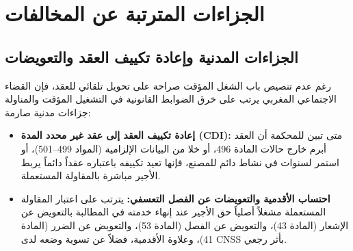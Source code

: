 \section{الجزاءات المترتبة عن المخالفات}

\subsection{الجزاءات المدنية وإعادة تكييف العقد والتعويضات}
رغم عدم تنصيص باب الشغل المؤقت صراحة على تحويل تلقائي للعقد، فإن القضاء الاجتماعي المغربي يرتب على خرق الضوابط القانونية في التشغيل المؤقت والمناولة جزاءات مدنية صارمة:
\begin{itemize}[leftmargin=*, itemsep=5pt]
    \item \textbf{إعادة تكييف العقد إلى عقد غير محدد المدة (\textenglish{CDI}):} متى تبين للمحكمة أن العقد أبرم خارج حالات المادة \textenglish{496}، أو خلا من البيانات الإلزامية (المواد \textenglish{499}--\textenglish{501})، أو استمر لسنوات في نشاط دائم للمصنع، فإنها تعيد تكييفه باعتباره عقداً دائماً يربط الأجير مباشرة بالمقاولة المستعملة.
    \item \textbf{احتساب الأقدمية والتعويضات عن الفصل التعسفي:} يترتب على اعتبار المقاولة المستعملة مشغلاً أصلياً حق الأجير عند إنهاء خدمته في المطالبة بالتعويض عن الإشعار (المادة \textenglish{43})، والتعويض عن الفصل (المادة \textenglish{53})، والتعويض عن الضرر (المادة \textenglish{41})، وعلاوة الأقدمية، فضلاً عن تسوية وضعه لدى \textenglish{CNSS} بأثر رجعي.
\end{itemize}

